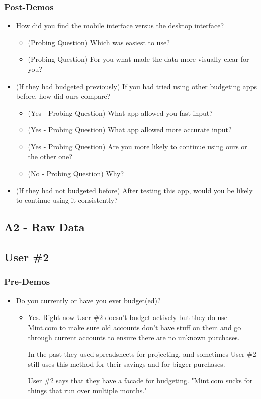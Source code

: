 \documentclass{chi2011}
\begin{document}
	\subsubsection{Post-Demos}
	\begin{itemize}[noitemsep]
		\item How did you find the mobile interface versus the desktop interface?
		\begin{itemize}[noitemsep]
			\item (Probing Question) Which was easiest to use?
			\item (Probing Question) For you what made the data more visually clear for you?
		\end{itemize}	
	\item (If they had budgeted previously) If you had tried using other budgeting apps before, how did ours compare?
		\begin{itemize}[noitemsep]
			\item (Yes - Probing Question) What app allowed you fast input?
			\item (Yes - Probing Question) What app allowed more accurate input?
			\item (Yes - Probing Question) Are you more likely to continue using ours or the other one?
			\item (No - Probing Question) Why?
		\end{itemize}
	\item (If they had not budgeted before) After testing this app, would you be likely to continue using it consistently? 
	\end{itemize}
	
	
	\subsection{A2 - Raw Data}
	\subsection{User \#2}

	\subsubsection{Pre-Demos}
	\begin{itemize}[noitemsep]
		\item Do you currently or have you ever budget(ed)?
		\begin{itemize}[noitemsep]
			\item 
				Yes. Right now User \#2 doesn't budget actively but they do use Mint.com to make sure old
				accounts don't have stuff on them and go through current accounts to ensure there are no
				unknown purchases. 
				
				In the past they used spreadsheets for projecting, and sometimes User \#2 still uses this
				method for their savings and for bigger purchases. 
				
				User \#2 says that they have a facade for budgeting. "Mint.com sucks for things that run over
				multiple months."
		\end{itemize}
	\end{itemize}
	
\end{document}

